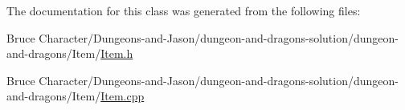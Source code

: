 The documentation for this class was generated from the following files\+:\begin{DoxyCompactItemize}
\item 
Bruce Character/\+Dungeons-\/and-\/\+Jason/dungeon-\/and-\/dragons-\/solution/dungeon-\/and-\/dragons/\+Item/\hyperlink{_item_8h}{Item.\+h}\item 
Bruce Character/\+Dungeons-\/and-\/\+Jason/dungeon-\/and-\/dragons-\/solution/dungeon-\/and-\/dragons/\+Item/\hyperlink{_item_8cpp}{Item.\+cpp}\end{DoxyCompactItemize}
